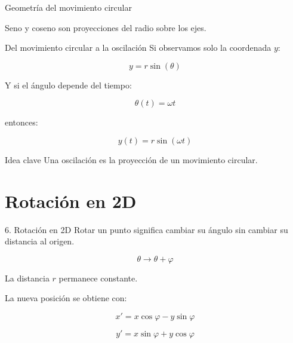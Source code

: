 \documentclass{beamer}
\begin{document}
\begin{frame}{Geometría del movimiento circular}
\begin{center}
\end{center}

Seno y coseno son proyecciones del radio sobre los ejes.
\end{frame}

\begin{frame}{Del movimiento circular a la oscilación}
Si observamos solo la coordenada \(y\):

\[
y=r\sin(\theta)
\]

\medskip

Y si el ángulo depende del tiempo:

\[
\theta(t)=\omega t
\]

entonces:

\[
y(t)=r\sin(\omega t)
\]

\medskip

\begin{block}{Idea clave}
Una oscilación es la proyección de un movimiento circular.
\end{block}
\end{frame}

\section{Rotación en 2D}

\begin{frame}{6. Rotación en 2D}
Rotar un punto significa cambiar su ángulo sin cambiar su distancia al origen.

\[
\theta \longrightarrow \theta+\varphi
\]

\medskip

La distancia \(r\) permanece constante.

\medskip

La nueva posición se obtiene con:

\[
x' = x\cos\varphi-y\sin\varphi
\]

\[
y' = x\sin\varphi+y\cos\varphi
\]
\end{frame}
\end{document}
